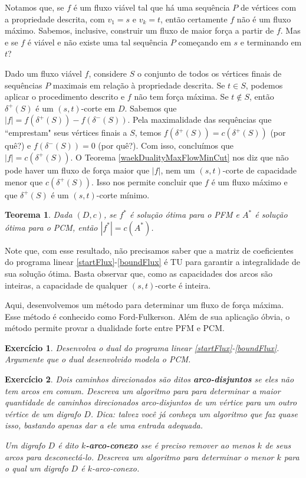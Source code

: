 \documentclass[]{article}
\newtheorem{teorema}{Teorema}
\newtheorem{exercicio}{Exercício}
\numberwithin{equation}{section}
\begin{document}
Notamos que, se $f$ é um fluxo viável tal que há uma sequência $P$ de vértices com a
propriedade descrita, com $v_1 = s$ e $v_k = t$, então certamente $f$ não é um fluxo máximo.
Sabemos, inclusive, construir um fluxo de maior força a partir de $f$.
Mas e se $f$ é viável e não existe uma tal sequência $P$ começando em $s$ e terminando em
$t$?

Dado um fluxo viável $f$, considere $S$ o conjunto de todos os vértices finais de sequências
$P$ maximais em relação à propriedade descrita.
Se $t \in S$, podemos aplicar o procedimento descrito e $f$ não tem força máxima.
Se $t \notin S$, então $\delta^+(S)$ é um $(s, t)$-corte em $D$.
Sabemos que $|f| = f(\delta^+(S)) - f(\delta^-(S))$.
Pela maximalidade das sequências que ``emprestam" seus vértices finais a $S$, temos
$f(\delta^+(S)) = c(\delta^+(S))$ (por quê?) e $f(\delta^-(S)) = 0$ (por quê?).
Com isso, concluímos que $|f| = c(\delta^+(S))$.
O Teorema \ref{waekDualityMaxFlowMinCut} nos diz que não pode haver um fluxo de força maior
que $|f|$, nem um $(s, t)$-corte de capacidade menor que $c(\delta^+(S))$.
Isso nos permite concluir que $f$ é um fluxo máximo e que $\delta^+(S)$ é um $(s, t)$-corte
mínimo.

\begin{teorema}
  Dada $(D, c)$, se $f^*$ é solução ótima para o PFM e $A^*$ é solução ótima para o PCM, então
  $|f^*| = c(A^*)$.
\end{teorema}

Note que, com esse resultado, não precisamos saber que a matriz de coeficientes do programa
linear \eqref{startFlux}-\eqref{boundFlux} é TU para garantir a integralidade de sua solução
ótima.
Basta observar que, como as capacidades dos arcos são inteiras, a capacidade de qualquer
$(s, t)$-corte é inteira.

Aqui, desenvolvemos um método para determinar um fluxo de força máxima.
Esse método é conhecido como Ford-Fulkerson.
Além de sua aplicação óbvia, o método permite provar a dualidade forte entre PFM e PCM.

\begin{exercicio}
  Desenvolva o dual do programa linear \eqref{startFlux}-\eqref{boundFlux}.
  Argumente que o dual desenvolvido modela o PCM.
\end{exercicio}

\begin{exercicio}
  Dois caminhos direcionados são ditos \textbf{arco-disjuntos} se eles não tem arcos em comum. Descreva um algoritmo para para determinar a maior quantidade de caminhos direcionados arco-disjuntos de um vértice para um outro vértice de um digrafo $D$. Dica: talvez você já conheça um algoritmo que faz quase isso, bastando apenas dar a ele uma entrada adequada.

  Um digrafo $D$ é dito \textbf{$k$-arco-conexo} sse é preciso remover ao menos $k$ de seus
  arcos para desconectá-lo. Descreva um algoritmo para determinar o menor $k$ para o qual um
  digrafo $D$ é $k$-arco-conexo.
\end{exercicio}
\end{document}
